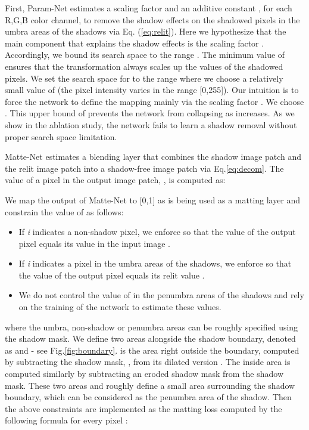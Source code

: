 \documentclass[runningheads]{llncs}
\begin{document}
First, Param-Net estimates a scaling factor  and an additive constant , for each R,G,B color channel, to remove the shadow effects on the shadowed pixels in the umbra areas of the shadows via Eq. (\ref{eq:relit}). Here we hypothesize that the main component that explains the shadow effects is the scaling factor . Accordingly, we bound its search space to the range . The minimum value of  ensures that the transformation always scales up the values of the shadowed pixels. We set the search space for  to the range  where we choose a relatively small value of  (the pixel intensity varies in the range [0,255]). Our intuition is to force the network to define the mapping mainly via the scaling factor . We choose . This upper bound of  prevents the network from collapsing as   increases. As we show in the ablation study, the network fails to learn a shadow removal without  proper search space limitation. 

Matte-Net estimates a blending layer  that combines the shadow image patch and the relit image patch into a shadow-free image patch via Eq.\ref{eq:decom}. The value of a pixel  in the output image patch, , is computed as:  

We map the output of Matte-Net to [0,1] as  is being used as a matting layer and constrain the value of  as follows:
\begin{itemize}
    \item If \textit{i} indicates a non-shadow pixel, we enforce  so that the value of the output pixel  equals its value in the input image .
    \item If \textit{i} indicates a pixel in the umbra areas of the shadows, we enforce  so that the value of the output pixel  equals its relit value .
    \item We do not control the value of  in the penumbra areas of the shadows and rely on the training of the network to estimate these values.
\end{itemize}

\noindent where the umbra, non-shadow or penumbra areas can be roughly specified using the shadow mask. We define two areas alongside the shadow boundary, denoted as  and  - see Fig.\ref{fig:boundary}.  is the area right outside the boundary, computed by subtracting the shadow mask, , from its dilated version . The inside area  is computed similarly by subtracting an eroded shadow mask from the shadow mask. 
These two areas  and  roughly define a small area surrounding the shadow boundary, which can be considered as the penumbra area of the shadow. Then the above constraints are implemented as the matting loss  computed by the following formula for every pixel :
\end{document}
